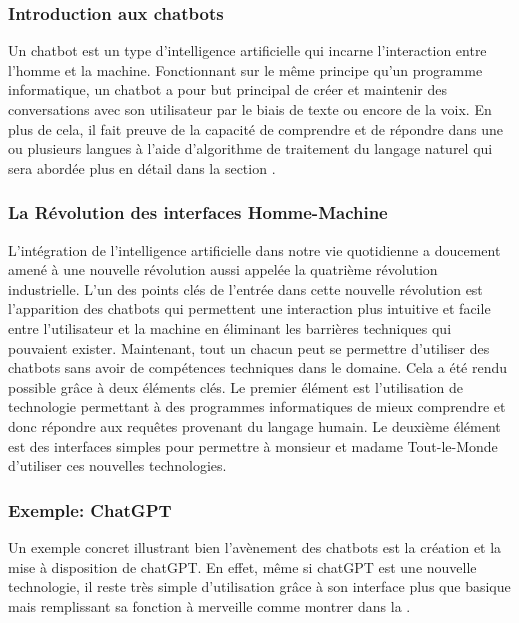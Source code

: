 \documentclass{rapport}
\begin{document}
\subsubsection{Introduction aux chatbots}
Un chatbot est un type d'intelligence artificielle qui incarne l'interaction entre l'homme et la machine. Fonctionnant sur le même principe qu'un programme informatique, un chatbot a pour but principal de créer et maintenir des conversations avec son utilisateur par le biais de texte ou encore de la voix. En plus de cela, il fait preuve de la capacité de comprendre et de répondre dans une ou plusieurs langues à l'aide d'algorithme de traitement du langage naturel qui sera abordée plus en détail dans la section .

\subsubsection{La Révolution des interfaces Homme-Machine}
L'intégration de l'intelligence artificielle dans notre vie quotidienne a doucement amené à une nouvelle révolution aussi appelée la quatrième révolution industrielle. L'un des points clés de l'entrée dans cette nouvelle révolution est l'apparition des chatbots qui permettent une interaction plus intuitive et facile entre l'utilisateur et la machine en éliminant les barrières techniques qui pouvaient exister. Maintenant, tout un chacun peut se permettre d'utiliser des chatbots sans avoir de compétences techniques dans le domaine. Cela a été rendu possible grâce à deux éléments clés. Le premier élément est l'utilisation de technologie permettant à des programmes informatiques de mieux comprendre et donc répondre aux requêtes provenant du langage humain. Le deuxième élément est des interfaces simples pour permettre à monsieur et madame Tout-le-Monde d'utiliser ces nouvelles technologies.

\subsubsection{Exemple: ChatGPT}
Un exemple concret illustrant bien l'avènement des chatbots est la création et la mise à disposition de chatGPT. En effet, même si chatGPT est une nouvelle technologie, il reste très simple d'utilisation grâce à son interface plus que basique mais remplissant sa fonction à merveille comme montrer dans la .
\end{document}
